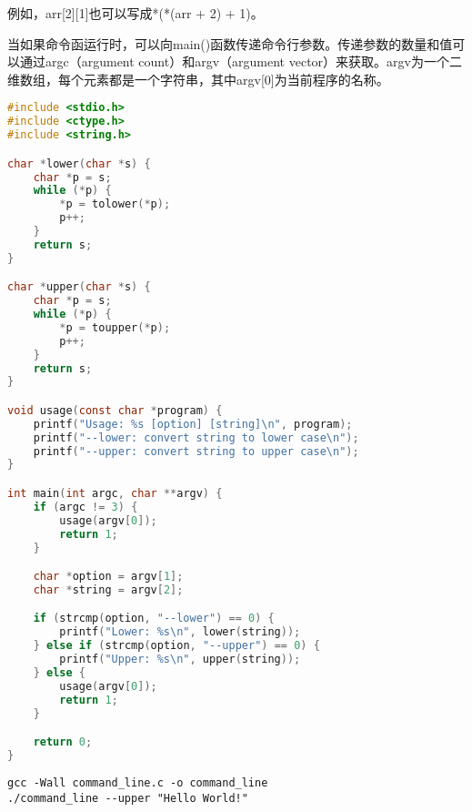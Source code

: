 例如，arr[2][1]也可以写成*(*(arr + 2) + 1)。

\begin{figure}[H]
    \centering
\end{figure}

当如果命令函运行时，可以向main()函数传递命令行参数。传递参数的数量和值可以通过argc（argument count）和argv（argument vector）来获取。argv为一个二维数组，每个元素都是一个字符串，其中argv[0]为当前程序的名称。\\


\begin{lstlisting}[language=C]
#include <stdio.h>
#include <ctype.h>
#include <string.h>

char *lower(char *s) {
    char *p = s;
    while (*p) {
        *p = tolower(*p);
        p++;
    }
    return s;
}

char *upper(char *s) {
    char *p = s;
    while (*p) {
        *p = toupper(*p);
        p++;
    }
    return s;
}

void usage(const char *program) {
    printf("Usage: %s [option] [string]\n", program);
    printf("--lower: convert string to lower case\n");
    printf("--upper: convert string to upper case\n");
}

int main(int argc, char **argv) {
    if (argc != 3) {
        usage(argv[0]);
        return 1;
    }

    char *option = argv[1];
    char *string = argv[2];

    if (strcmp(option, "--lower") == 0) {
        printf("Lower: %s\n", lower(string));
    } else if (strcmp(option, "--upper") == 0) {
        printf("Upper: %s\n", upper(string));
    } else {
        usage(argv[0]);
        return 1;
    }

    return 0;
}
\end{lstlisting}

\begin{lstlisting}
gcc -Wall command_line.c -o command_line
./command_line --upper "Hello World!"
\end{lstlisting}

